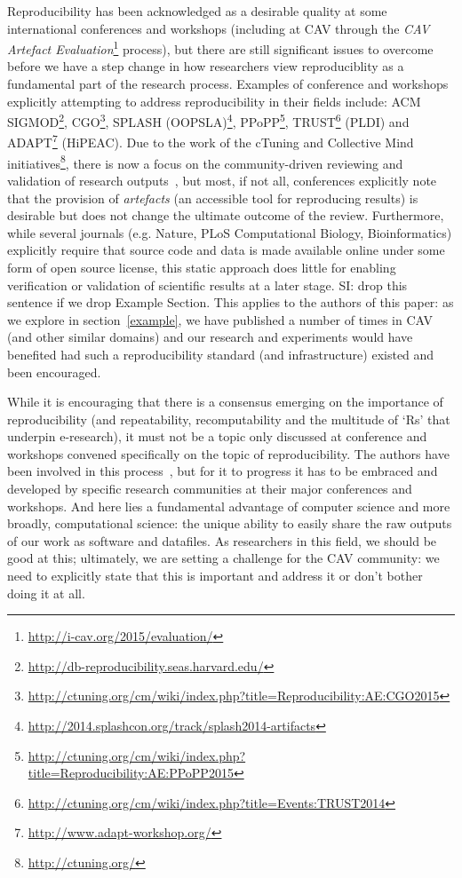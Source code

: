 \documentclass{llncs}
\begin{document}
Reproducibility has been acknowledged as a desirable quality at some
international conferences and workshops (including at CAV through the
{\emph{CAV Artefact
Evaluation}}\footnote{\url{http://i-cav.org/2015/evaluation/}}
process), but there are still significant issues to overcome before we
have a step change in how researchers view reproduciblity as a
fundamental part of the research process. Examples of conference and
workshops explicitly attempting to address reproducibility in their
fields include: ACM
SIGMOD\footnote{\url{http://db-reproducibility.seas.harvard.edu/}},
CGO\footnote{\url{http://ctuning.org/cm/wiki/index.php?title=Reproducibility:AE:CGO2015}},
SPLASH
(OOPSLA)\footnote{\url{http://2014.splashcon.org/track/splash2014-artifacts}},
PPoPP\footnote{\url{http://ctuning.org/cm/wiki/index.php?title=Reproducibility:AE:PPoPP2015}},
TRUST\footnote{\url{http://ctuning.org/cm/wiki/index.php?title=Events:TRUST2014}}
(PLDI) and ADAPT\footnote{\url{http://www.adapt-workshop.org/}}
(HiPEAC). Due to the work of the cTuning and Collective Mind
initiatives\footnote{\url{http://ctuning.org/}}, there is now a focus
on the community-driven reviewing and validation of research
outputs~\cite{fursin+dubach:2014}, but most, if not all, conferences
explicitly note that the provision of \emph{artefacts} (an accessible
tool for reproducing results) is desirable but does not change the
ultimate outcome of the review.  Furthermore, while several journals
(e.g. Nature, PLoS Computational Biology, Bioinformatics) explicitly
require that source code and data is made available online under some
form of open source license, this static approach does little for
enabling verification or validation of scientific results at a later
stage. 
SI: drop this sentence if we drop Example Section.
This applies to the authors of this paper: as we explore in
section~\ref{example}, we have published a number of times in CAV (and
other similar domains) and our research and experiments would have
benefited had such a reproducibility standard (and infrastructure)
existed and been encouraged.

While it is encouraging that there is a consensus emerging on the
importance of reproducibility (and repeatability, recomputability and
the multitude of `Rs' that underpin e-research), it must not be a
topic only discussed at conference and workshops convened specifically
on the topic of reproducibility. The authors have been involved in
this process~\cite{crick+chuehong:2014}, but for it to progress it has
to be embraced and developed by specific research communities at their
major conferences and workshops. And here lies a fundamental advantage
of computer science and more broadly, computational science: the
unique ability to easily share the raw outputs of our work as software
and datafiles. As researchers in this field, we should be good at
this; ultimately, we are setting a challenge for the CAV community: we
need to explicitly state that this is important and address it or
don't bother doing it at all.
\end{document}
